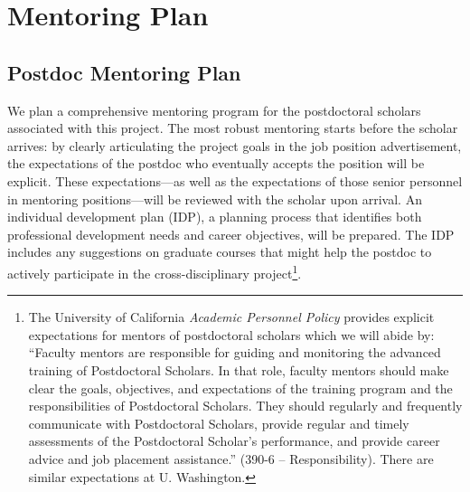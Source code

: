 \documentclass[11pt]{article}
\begin{document}
\section*{Mentoring Plan}

\setcounter{page}{1}

\subsection*{Postdoc Mentoring Plan}

We plan a comprehensive mentoring program for the postdoctoral scholars
associated with this project. The most robust mentoring starts before the
scholar arrives: by clearly articulating the project goals in the job position
advertisement, the expectations of the postdoc who eventually accepts the
position will be explicit. These expectations---as well as the expectations of
those senior personnel in mentoring positions---will be reviewed with the
scholar upon arrival. An individual development plan (IDP), a planning process
that identifies both professional development needs and career objectives, will
be prepared. The IDP includes any suggestions on graduate courses that might
help the postdoc to actively participate in the cross-disciplinary
project\footnote{The University of California \textit{Academic Personnel Policy}
provides explicit expectations for mentors of postdoctoral scholars which we
will abide by: ``Faculty mentors are responsible for guiding and monitoring the
advanced training of Postdoctoral Scholars. In that role, faculty mentors should
make clear the goals, objectives, and expectations of the training program and
the responsibilities of Postdoctoral Scholars. They should regularly and
frequently communicate with Postdoctoral Scholars, provide regular and timely
assessments of the Postdoctoral Scholar's performance, and provide career advice
and job placement assistance.'' (390-6 -- Responsibility). There are similar
expectations at U. Washington.}.
\end{document}

